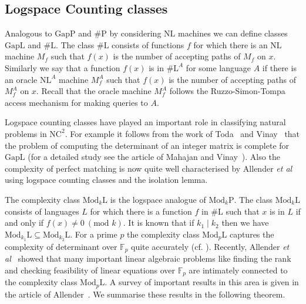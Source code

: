 \documentclass[11pt]{madras}%
\theoremstyle{remark}
\newcommand{\ModkP}[1]{{\ensuremath{\mathrm{Mod}_{#1}\mathrm{P}}}}
\newcommand{\ModkL}[1]{{\ensuremath{\mathrm{Mod}_{#1}\mathrm{L}}}}
\newcommand{\etal}[0]{{\emph{et al}}}
\begin{document}
\subsection*{Logspace Counting classes}

Analogous to $\mathrm{GapP}$ and $\# \mathrm{P}$ by considering
$\mathrm{NL}$ machines we can define classes $\mathrm{GapL}$ and $\#
\mathrm{L}$. The class $\# \mathrm{L}$ consists of functions $f$ for
which there is an $\mathrm{NL}$ machine $M_f$ such that $f(x)$ is the
number of accepting paths of $M_f$ on $x$. Similarly we say that a
function $f(x)$ is in $\# \mathrm{L}^A$ for some language $A$ if there
is an oracle $\mathrm{NL}^A$ machine $M_f^A$ such that $f(x)$ is the
number of accepting paths of $M_f^A$ on $x$. Recall that the oracle
machine $M_f^A$ follows the Ruzzo-Simon-Tompa access mechanism for
making queries to $A$.

Logspace counting classes have played an important role in classifying
natural problems in $\mathrm{NC}^2$. For example it follows from the
work of Toda~\cite{toda91determinant} and Vinay~\cite{vinay91pda} that
the problem of computing the determinant of an integer matrix is
complete for $\mathrm{GapL}$ (for a detailed study see the article of
Mahajan and Vinay~\cite{mahajan99determinant}).  Also the complexity
of perfect matching is now quite well characterised by Allender
\etal~\cite{allender99isolation} using logspace counting classes and
the isolation lemma.




The complexity class $\ModkL{k}$ is the logspace analogue of
$\ModkP{k}$.  The class $\ModkL{k}$ consists of languages $L$ for
which there is a function $f$ in $\# \mathrm{L}$ such that $x$ is in
$L$ if and only if $f(x) \neq 0\ (\textrm{mod } k)$.  It is known that
if $k_1 \mid k_2$ then we have $\ModkL{k_1} \subseteq \ModkL{k_2}$.
For a prime $p$ the complexity class $\ModkL{p}$ captures the
complexity of determinant over $\mathbb{F}_p$ quite accurately (cf.
\cite{buntrock92structure}).  Recently, Allender
\etal~\cite{allender99complexity} showed that many important linear
algebraic problems like finding the rank and checking feasibility of
linear equations over $\mathbb{F}_p$ are intimately connected to the
complexity class $\ModkL{p}$. A survey of important results in this
area is given in the article of
Allender~\cite{allender2004arithmetic}.  We summarise these results in
the following theorem.
\end{document}
